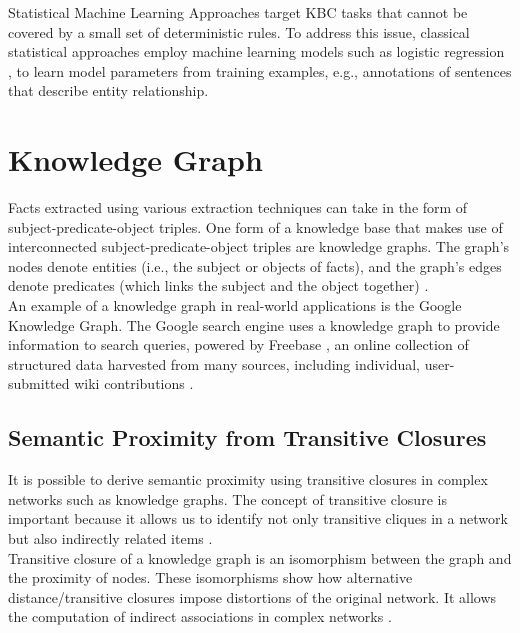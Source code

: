 \documentclass[10pt,11pt,12pt,oneside]{book}
\begin{document}
	Statistical Machine Learning Approaches target KBC tasks that cannot be covered by a small set of deterministic rules. To address this issue, classical statistical approaches employ machine learning models such as logistic regression \cite {michelakis_krishnamurthy_haas_vaithyanathan_2009}, \cite{lafferty2001conditional} to learn model parameters from training examples, e.g., annotations of sentences that describe entity relationship.\\
	
	
	\section{Knowledge Graph}
	
	Facts extracted using various extraction techniques can take in the form of subject-predicate-object triples. One form of a knowledge base that makes use of interconnected subject-predicate-object triples are knowledge graphs. The graph’s nodes denote entities (i.e., the subject or objects of facts), and the graph’s edges denote predicates (which links the subject and the object together) \cite{sutton2004collective}.\\
	
	 An example of a knowledge graph in real-world applications is the Google Knowledge Graph. The Google search engine uses a knowledge graph to provide information to search queries, powered by Freebase \cite{goog_kg}, an online collection of structured data harvested from many sources, including individual, user-submitted wiki contributions \cite{freebase}.
	
	\subsection{Semantic Proximity from Transitive Closures}
	 It is possible to derive semantic proximity using transitive closures in complex networks such as knowledge graphs. The concept of transitive closure is important because it allows us to identify not only transitive cliques in a network but also indirectly related items \cite{SIMAS2015}.\\
	
	Transitive closure of a knowledge graph is an isomorphism between the graph and the proximity of nodes. These isomorphisms show how alternative distance/transitive closures impose distortions of the original network. It allows the computation of indirect associations in complex networks \cite{SIMAS2015}.
	
\end{document}
